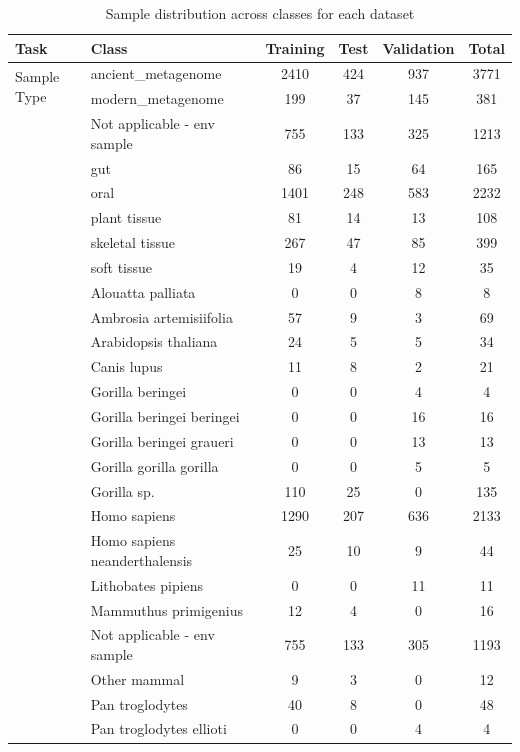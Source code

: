 \begin{table}[!t]
\caption{Sample distribution across classes for each dataset\label{tab:class_distribution}}
\begin{tabular*}{\textwidth}{@{\extracolsep{\fill}}llcccc@{\extracolsep{\fill}}}
\toprule
Task & Class & Training & Test & Validation & Total \\
\midrule
\multirow{2}{*}{Sample Type} & ancient\_metagenome & 2410 & 424 & 937 & 3771 \\
 & modern\_metagenome & 199 & 37 & 145 & 381 \\
\addlinespace
\multirow{6}{*}{Community Type} & Not applicable - env sample & 755 & 133 & 325 & 1213 \\
 & gut & 86 & 15 & 64 & 165 \\
 & oral & 1401 & 248 & 583 & 2232 \\
 & plant tissue & 81 & 14 & 13 & 108 \\
 & skeletal tissue & 267 & 47 & 85 & 399 \\
 & soft tissue & 19 & 4 & 12 & 35 \\
\addlinespace
\multirow{23}{*}{Sample Host} & Alouatta palliata & 0 & 0 & 8 & 8 \\
 & Ambrosia artemisiifolia & 57 & 9 & 3 & 69 \\
 & Arabidopsis thaliana & 24 & 5 & 5 & 34 \\
 & Canis lupus & 11 & 8 & 2 & 21 \\
 & Gorilla beringei & 0 & 0 & 4 & 4 \\
 & Gorilla beringei beringei & 0 & 0 & 16 & 16 \\
 & Gorilla beringei graueri & 0 & 0 & 13 & 13 \\
 & Gorilla gorilla gorilla & 0 & 0 & 5 & 5 \\
 & Gorilla sp. & 110 & 25 & 0 & 135 \\
 & Homo sapiens & 1290 & 207 & 636 & 2133 \\
 & Homo sapiens neanderthalensis & 25 & 10 & 9 & 44 \\
 & Lithobates pipiens & 0 & 0 & 11 & 11 \\
 & Mammuthus primigenius & 12 & 4 & 0 & 16 \\
 & Not applicable - env sample & 755 & 133 & 305 & 1193 \\
 & Other mammal & 9 & 3 & 0 & 12 \\
 & Pan troglodytes & 40 & 8 & 0 & 48 \\
 & Pan troglodytes ellioti & 0 & 0 & 4 & 4 \\

\end{tabular*}
\end{table}
